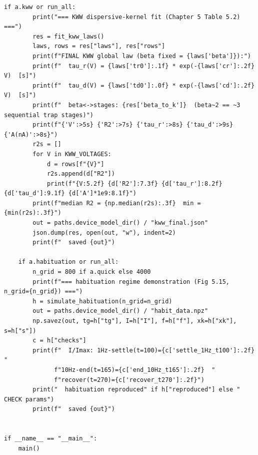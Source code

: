 \begin{lstlisting}[caption={mrl\_trace/device.py},label={lst:siox-src-device}]
    if a.kww or run_all:
        print("=== KWW dispersive-kernel fit (Chapter 5 Table 5.2) ===")
        res = fit_kww_laws()
        laws, rows = res["laws"], res["rows"]
        print(f"FINAL KWW global law (beta fixed = {laws['beta']}):")
        print(f"  tau_r(V) = {laws['tr0']:.1f} * exp(-{laws['cr']:.2f} V)  [s]")
        print(f"  tau_d(V) = {laws['td0']:.0f} * exp(-{laws['cd']:.2f} V)  [s]")
        print(f"  beta<->stages: {res['beta_to_k']}  (beta~2 == ~3 sequential trap stages)")
        print(f"{'V':>5s} {'R2':>7s} {'tau_r':>8s} {'tau_d':>9s} {'A(nA)':>8s}")
        r2s = []
        for V in KWW_VOLTAGES:
            d = rows[f"{V}"]
            r2s.append(d["R2"])
            print(f"{V:5.2f} {d['R2']:7.3f} {d['tau_r']:8.2f} {d['tau_d']:9.1f} {d['A']*1e9:8.1f}")
        print(f"median R2 = {np.median(r2s):.3f}  min = {min(r2s):.3f}")
        out = paths.device_model_dir() / "kww_final.json"
        json.dump(res, open(out, "w"), indent=2)
        print(f"  saved {out}")

    if a.habituation or run_all:
        n_grid = 800 if a.quick else 4000
        print(f"=== habituation regime demonstration (Fig 5.15, n_grid={n_grid}) ===")
        h = simulate_habituation(n_grid=n_grid)
        out = paths.device_model_dir() / "habit_data.npz"
        np.savez(out, tg=h["tg"], I=h["I"], f=h["f"], xk=h["xk"], s=h["s"])
        c = h["checks"]
        print(f"  I/Imax: 1Hz-settle(t=100)={c['settle_1Hz_t100']:.2f}  "
              f"10Hz-end(t=165)={c['end_10Hz_t165']:.2f}  "
              f"recover(t=270)={c['recover_t270']:.2f}")
        print("  habituation reproduced" if h["reproduced"] else "  CHECK params")
        print(f"  saved {out}")


if __name__ == "__main__":
    main()
\end{lstlisting}

